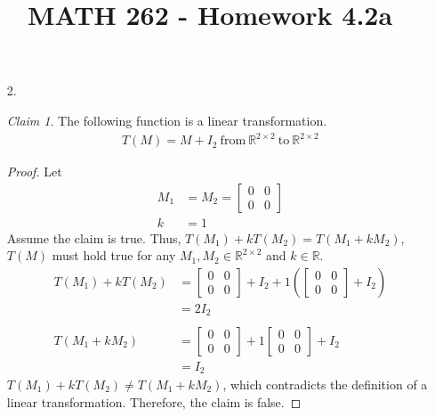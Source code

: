 \documentclass[letterpaper,12pt]{article}
\author{}
\title{MATH 262 - Homework 4.2a}
\date{} %
\theoremstyle{remark}
\newtheorem*{claim}{Claim}
\begin{document}
\maketitle

\begin{enumerate}
  \item[2.]
    \begin{claim}
      The following function is a linear transformation.
      \begin{align*}
        T(M) = M + I_2 \ \text{from} \ \mathbb{R}^{2 \times 2} \ \text{to} \ \mathbb{R}^{2 \times 2}
      \end{align*}
    \end{claim}
    \begin{proof}
      Let
      \begin{align*}
        M_1 &= M_2 = \begin{bmatrix}
          0 & 0 \\
          0 & 0
        \end{bmatrix} \\
        k &= 1
      \end{align*}
      Assume the claim is true. Thus, $T(M_1) + kT(M_2) = T(M_1 + kM_2)$, $T(M)$ must hold true for any $M_1,M_2 \in \mathbb{R}^{2 \times 2}$ and $k \in \mathbb{R}$.
      \begin{align*}
        T(M_1) + kT(M_2) &=
        \begin{bmatrix}
          0 & 0 \\
          0 & 0
        \end{bmatrix} + I_2 +
        1\left(\begin{bmatrix}
          0 & 0 \\
          0 & 0
        \end{bmatrix} + I_2\right) \\
        &= 2I_2 \\
        \\
        T(M_1 + kM_2) &=
        \begin{bmatrix}
          0 & 0 \\
          0 & 0
        \end{bmatrix} +
        1\begin{bmatrix}
          0 & 0 \\
          0 & 0
        \end{bmatrix} + I_2 \\
        &= I_2
      \end{align*}
      $T(M_1) + kT(M_2) \ne T(M_1 + kM_2)$, which contradicts the definition of a linear transformation. Therefore, the claim is false.
    \end{proof}
\end{enumerate}
\end{document}
